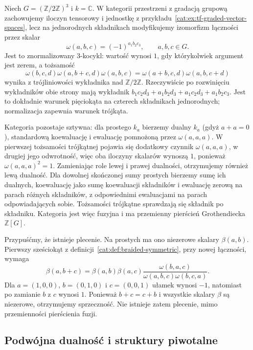 \begin{przyklad}\label{cat:ex:tf-commutative-nonbraided}
Niech $G=(\mathbb Z/2\mathbb Z)^3$ i $k=\mathbb C$. W kategorii przestrzeni z gradacją grupową zachowujemy iloczyn tensorowy i jednostkę z przykładu~\ref{cat:ex:tf-graded-vector-spaces}, lecz na jednorodnych składnikach modyfikujemy izomorfizm łączności przez skalar
\[
 \omega(a,b,c)=(-1)^{a_1b_2c_3},
 \qquad a,b,c\in G.
\]
Jest to znormalizowany $3$-kocykl: wartość wynosi $1$, gdy którykolwiek argument jest zerem, a tożsamość
\[
 \omega(b,c,d)\omega(a,b+c,d)\omega(a,b,c)
 =\omega(a+b,c,d)\omega(a,b,c+d)
\]
wynika z trójliniowości wykładnika nad $\mathbb Z/2\mathbb Z$. Rzeczywiście po rozwinięciu wykładników obie strony mają wykładnik $b_1c_2d_3+a_1b_2d_3+a_1c_2d_3+a_1b_2c_3$. Jest to dokładnie warunek pięciokąta na czterech składnikach jednorodnych; normalizacja zapewnia warunek trójkąta.

Kategoria pozostaje sztywna: dla prostego $k_a$ bierzemy dualny $k_a$ (gdyż $a+a=0$), standardową koewaluację i ewaluację pomnożoną przez $\omega(a,a,a)$. W pierwszej tożsamości trójkątnej pojawia się dodatkowy czynnik $\omega(a,a,a)$, w drugiej jego odwrotność, więc oba iloczyny skalarów wynoszą $1$, ponieważ $\omega(a,a,a)^2=1$. Zamieniając role lewej i prawej dualności, otrzymujemy również lewą dualność. Dla dowolnej skończonej sumy prostych bierzemy sumę ich dualnych, koewaluację jako sumę koewaluacji składników i ewaluację zerową na parach różnych składników, z odpowiednimi ewaluacjami na parach odpowiadających sobie. Tożsamości trójkątne sprawdzają się składnik po składniku. Kategoria jest więc fuzyjna i ma przemienny pierścień Grothendiecka $\mathbb Z[G]$.

Przypuśćmy, że istnieje plecenie. Na prostych ma ono niezerowe skalary $\beta(a,b)$. Pierwszy sześciokąt z definicji~\ref{cat:def:braided-symmetric}, przy nowej łączności, wymaga
\[
 \beta(a,b+c)
 =\beta(a,b)\beta(a,c)
 \frac{\omega(b,a,c)}{\omega(a,b,c)\omega(b,c,a)}.
\]
Dla $a=(1,0,0)$, $b=(0,1,0)$ i $c=(0,0,1)$ ułamek wynosi $-1$, natomiast po zamianie $b$ z $c$ wynosi $1$. Ponieważ $b+c=c+b$ i wszystkie skalary $\beta$ są niezerowe, otrzymujemy sprzeczność. Nie istnieje zatem plecenie, mimo przemienności pierścienia fuzji.
\end{przyklad}

\subsection{Podwójna dualność i struktury piwotalne}

